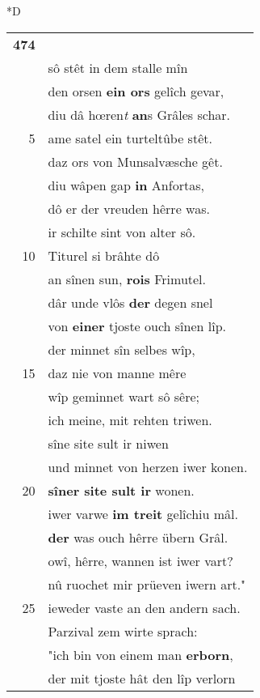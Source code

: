\documentclass[8pt,a4paper,notitlepage]{article}
\begin{document}
\begin{table}[ht]
\begin{minipage}[t]{0.5\linewidth}
\small
\begin{center}*D
\end{center}
\begin{tabular}{rl}
\textbf{474} & \textit{\begin{large}H\end{large}}êrre, sît irz, Læhelin?\\ 
 & sô stêt in dem stalle mîn\\ 
 & den orsen \textbf{ein ors} gelîch gevar,\\ 
 & diu dâ hœren\textit{t} \textbf{an}s Grâles schar.\\ 
5 & ame satel ein turteltûbe stêt.\\ 
 & daz ors von Munsalvæsche gêt.\\ 
 & diu wâpen gap \textbf{in} Anfortas,\\ 
 & dô er der vreuden hêrre was.\\ 
 & ir schilte sint von alter sô.\\ 
10 & Titurel si brâhte dô\\ 
 & an sînen sun, \textbf{rois} Frimutel.\\ 
 & dâr unde vlôs \textbf{der} degen snel\\ 
 & von \textbf{einer} tjoste ouch sînen lîp.\\ 
 & der minnet sîn selbes wîp,\\ 
15 & daz nie von manne mêre\\ 
 & wîp geminnet wart sô sêre;\\ 
 & ich meine, mit rehten triwen.\\ 
 & sîne site sult ir niwen\\ 
 & und minnet von herzen iwer konen.\\ 
20 & \textbf{sîner site sult ir} wonen.\\ 
 & iwer varwe \textbf{im treit} gelîchiu mâl.\\ 
 & \textbf{der} was ouch hêrre übern Grâl.\\ 
 & owî, hêrre, wannen ist iwer vart?\\ 
 & nû ruochet mir prüeven iwern art."\\ 
25 & ieweder vaste an den andern sach.\\ 
 & Parzival zem wirte sprach:\\ 
 & "ich bin von einem man \textbf{erborn},\\ 
 & der mit tjoste hât den lîp verlorn\\ 

\end{tabular}
\end{minipage}
\end{table}
\end{document}
